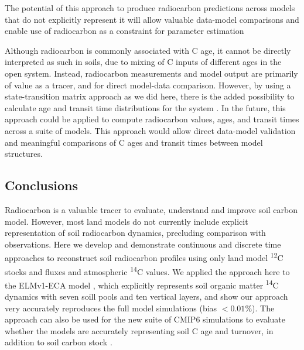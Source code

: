 \documentclass[11pt,a4paper]{article}
\newcommand{\red}[1]{\textcolor{red}{#1}}
\begin{document}

The potential of this approach to produce radiocarbon predictions across models that do not explicitly represent it will allow valuable data-model comparisons and enable use of radiocarbon as a constraint for parameter estimation \citep{He2016}

Although radiocarbon is commonly associated with C age, it cannot be directly interpreted as such in soils, due to mixing of C inputs of different ages in the open system. Instead, radiocarbon measurements and model output are primarily of value as a tracer, and for direct model-data comparison. However, by using a state-transition matrix approach as we did here, there is the added possibility to calculate age and transit time distributions for the system \citep{Metzler2018PNAS}. In the future, this approach could be applied to compute radiocarbon values, ages, and transit times across a suite of models. This approach would allow direct data-model validation and meaningful comparisons of C ages and transit times between model structures. 

\subsection{Conclusions}
Radiocarbon is a valuable tracer to evaluate, understand and improve soil carbon model. However, most land models do not currently include explicit representation of soil radiocarbon dynamics, precluding comparison with observations. Here we develop and demonstrate continuous and discrete time approaches to reconstruct soil radiocarbon profiles using only land model \textsuperscript{12}C stocks and fluxes and atmospheric \textsuperscript{14}C values. We applied the approach here to the ELMv1-ECA model \citep{Zhu2019, Riley2018,Tang2018EI}, which explicitly represents soil organic matter \textsuperscript{14}C dynamics with seven soill pools and ten vertical layers, and show our approach very accurately reproduces the full model simulations (bias $<0.01$\%). The approach can also be used for the new suite of CMIP6 simulations to evaluate whether the models are accurately representing soil C age and turnover, in addition to soil carbon stock \citep{He2016}. 
\end{document}
